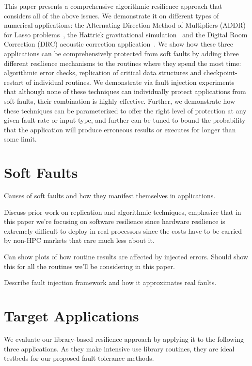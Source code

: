 \documentclass{sig-alternate}
\begin{document}
This paper presents a comprehensive algorithmic resilience approach that considers all of the above issues.
We demonstrate it on different types of numerical applications: the Alternating Direction Method of Multipliers (ADDR) for Lasso problems~\cite{lasso:2011}, the Hattrick gravitational simulation~\cite{hattrick:2012} and the Digital Room Correction (DRC) acoustic correction application~\cite{drc:2012}.
We show how these three applications can be comprehensively protected from soft faults by adding three different resilience mechanisms to the routines where they spend the most time: algorithmic error checks, replication of critical data structures and checkpoint-restart of individual routines.
We demonstrate via fault injection experiments that although none of these techniques can individually protect applications from soft faults, their combination is highly effective.
Further, we demonstrate how these techniques can be parameterized to offer the right level of protection at any given fault rate or input type, and further can be tuned to bound the probability that the application will produce erroneous results or executes for longer than some limit.

\section{Soft Faults}
\label{sec:soft_faults}

Causes of soft faults and how they manifest themselves in applications.

Discuss prior work on replication and algorithmic techniques, emphasize that in this paper we're focusing on software resilience since hardware resilience is extremely difficult to deploy in real processors since the costs have to be carried by non-HPC markets that care much less about it.

Can show plots of how routine results are affected by injected errors. Should show this for all the routines we'll be considering in this paper.

Describe fault injection framework and how it approximates real faults.

\section{Target Applications}
\label{sec:apps}

We evaluate our library-based resilience approach by applying it to the following three applications.
As they make intensive use library routines, they are ideal testbeds for our proposed fault-tolerance methods.
\end{document}
